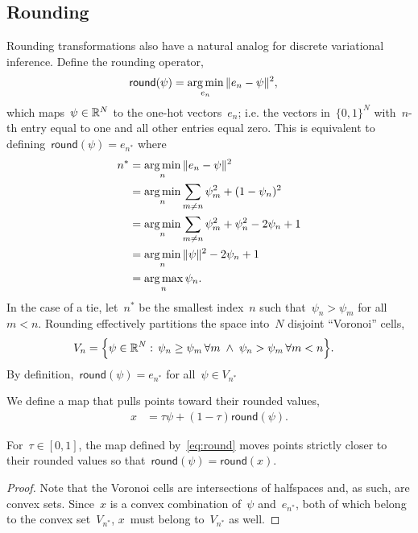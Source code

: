 \documentclass[twoside]{article}
\begin{document}
\subsection{Rounding}
Rounding transformations also have a natural analog for discrete
variational inference.  Define the rounding operator,
\begin{align*}
  \mathsf{round}(\psi)
  &= \argmin_{e_n} \| e_n - \psi \|^2,
\end{align*}
which maps~${\psi \in \mathbb{R}^N}$ to the one-hot vectors~${e_n}$;
i.e. the vectors in~${\{0,1\}^N}$ with~$n$-th entry equal to one and
all other entries equal zero.  This is equivalent to
defining~${\mathsf{round}(\psi) = e_{n^*}}$ where
\begin{align*}
  n^* &= \argmin_{n} \|e_n - \psi \|^2 \\
  &= \argmin_{n} \sum_{m \neq n} \psi_m^2 + (1 - \psi_n)^2  \\
  &= \argmin_{n} \sum_{m \neq n} \psi_m^2 + \psi_n^2 - 2\psi_n + 1 \\
  &= \argmin_{n} \|\psi\|^2 - 2\psi_n + 1 \\
  &= \argmax_n \psi_n.
\end{align*}
In the case of a tie, let~$n^*$ be the smallest index~$n$ such
that~$\psi_n > \psi_m$ for all~$m < n$. Rounding effectively
partitions the space into~$N$ disjoint ``Voronoi'' cells,
\begin{align*}
  V_n &= \Big \{ \psi \in \mathbb{R}^N : \,
        \psi_n \geq \psi_m \, \forall m \; \wedge \;
        \psi_n > \psi_m \, \forall m < n
        \Big \}.
\end{align*}
By definition,~${\mathsf{round}(\psi) = e_{n^*}}$ for
all~${\psi \in V_{n^*}}$


We define a map that pulls points toward their rounded values,
\begin{align}
  \label{eq:round}
  x &=  \tau \psi + (1-\tau) \mathsf{round}(\psi).
\end{align}

\begin{proposition}
  \label{prop:round}
  For~${\tau \in [0,1]}$, the map defined by~\eqref{eq:round} moves
  points strictly closer to their rounded values so
  that~$\mathsf{round}(\psi) = \mathsf{round}(x)$.
\end{proposition}

\begin{proof}
  Note that the Voronoi cells are intersections of halfspaces
  and, as such, are convex sets.  Since~$x$ is a convex combination
  of~$\psi$ and~$e_{n^*}$, both of which belong to the convex
  set~$V_{n^*}$, $x$~must belong to~$V_{n^*}$ as well.
\end{proof}
\end{document}
